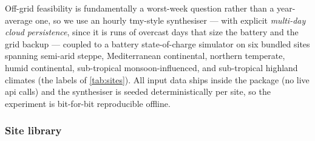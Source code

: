 \documentclass[11pt,a4paper]{article}
\begin{document}
Off-grid feasibility is fundamentally a worst-week question rather than a year-average one, so we use an hourly \gls{tmy}-style synthesiser --- with explicit \emph{multi-day cloud persistence}, since it is runs of overcast days that size the battery and the grid backup --- coupled to a battery state-of-charge simulator on six bundled sites spanning semi-arid steppe, Mediterranean continental, northern temperate, humid continental, sub-tropical monsoon-influenced, and sub-tropical highland climates (the labels of \cref{tab:sites}). All input data ships inside the package (no live \gls{api} calls) and the synthesiser is seeded deterministically per site, so the experiment is bit-for-bit reproducible offline.

\subsubsection{Site library}\label{sec:sites}

\begin{table}[H]
\centering\small
\caption{Six bundled climate sites used by the energy simulator (monthly clearness index, mean wind speed at ${\approx}\SI{10}{\meter}$ reference height, and mean temperature transcribed from the sources listed). The synthesiser reproduces the published annual GHI within ${\approx}5\,\%$ on five sites and underestimates Ludhiana by ${\approx}12\,\%$ (a known conservativeness of the Haurwitz envelope at low latitude) --- Ludhiana's off-grid results are correspondingly conservative.}\label{tab:sites}
\end{table}
\end{document}

